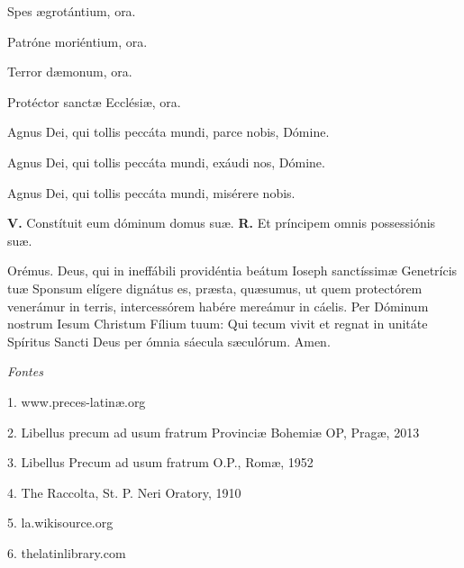 \documentclass[12pt,a6paper]{book}
\newcommand{\V}{\textbf{V.} }
\newcommand{\R}{\textbf{R.} }
\newcommand{\centeredtext}[1]{\parbox{\linewidth}{\centering\textit{#1}}}
\begin{document}
\begin{sloppy}
Spes ægrotántium, ora.

Patróne moriéntium, ora.

Terror dæmonum, ora.

Protéctor sanctæ Ecclésiæ, ora.

\vspace{3mm}

Agnus Dei, qui tollis peccáta mundi, parce nobis, Dómine.  

Agnus Dei, qui tollis peccáta mundi, exáudi nos, Dómine.  

Agnus Dei, qui tollis peccáta mundi, misérere nobis.  

\V Constítuit eum dóminum domus suæ.
\R Et príncipem omnis possessiónis suæ.

Orémus. Deus, qui in ineffábili providéntia beátum Ioseph sanctíssimæ Genetrícis tuæ Sponsum elígere dignátus es, præsta, quæsumus, ut quem protectórem venerámur in terris, intercessórem habére mereámur in cáelis. Per Dóminum nostrum Iesum Christum Fílium tuum: Qui tecum vivit et regnat in unitáte Spíritus Sancti Deus per ómnia sáecula sæculórum. Amen.

\vfill

\centeredtext{Fontes}
1. www.preces-latinæ.org

2. Libellus precum ad usum fratrum Provinciæ Bohemiæ OP, Pragæ, 2013

3. Libellus Precum ad usum fratrum O.P., Romæ, 1952

4. The Raccolta, St. P. Neri Oratory, 1910

5. la.wikisource.org

6. thelatinlibrary.com


\end{sloppy}

\vfill
\pagebreak

\pagestyle{plain}
\setlength{\cftbeforetoctitleskip}{-1em}
\setlength{\cftaftertoctitleskip}{-0.8em}
\renewcommand{\contentsname}{\normalsize \centeredtext{INDEX GENERALIS}}   


\tableofcontents
\end{document}
